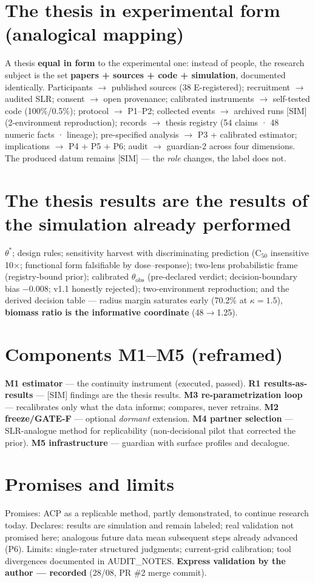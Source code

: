 \documentclass[10pt,twocolumn]{article}
\begin{document}
\section{The thesis in experimental form (analogical mapping)}
A thesis \textbf{equal in form} to the experimental one: instead of people, the research subject is the set \textbf{papers + sources + code + simulation}, documented identically. Participants $\to$ published sources (38 E-registered); recruitment $\to$ audited SLR; consent $\to$ open provenance; calibrated instruments $\to$ self-tested code (100\%/0.5\%); protocol $\to$ P1--P2; collected events $\to$ archived runs [SIM] (2-environment reproduction); records $\to$ thesis registry (54 claims · 48 numeric facts · lineage); pre-specified analysis $\to$ P3 + calibrated estimator; implications $\to$ P4 + P5 + P6; audit $\to$ guardian-2 across four dimensions. The produced datum remains [SIM] — the \emph{role} changes, the label does not.
\section{The thesis results are the results of the simulation already performed}
$\theta^{*}$; design rules; sensitivity harvest with discriminating prediction (C$_{50}$ insensitive 10$\times$; functional form falsifiable by dose--response); two-lens probabilistic frame (registry-bound prior); calibrated $\theta_{\text{obs}}$ (pre-declared verdict; decision-boundary bias $-0.008$; v1.1 honestly rejected); two-environment reproduction; and the derived decision table — radius margin saturates early (70.2\% at $\kappa{=}1.5$), \textbf{biomass ratio is the informative coordinate} (48$\to$1.25).
\section{Components M1--M5 (reframed)}
\textbf{M1 estimator} — the continuity instrument (executed, passed). \textbf{R1 results-as-results} — [SIM] findings are the thesis results. \textbf{M3 re-parametrization loop} — recalibrates only what the data informs; compares, never retrains. \textbf{M2 freeze/GATE-F} — optional \emph{dormant} extension. \textbf{M4 partner selection} — SLR-analogue method for replicability (non-decisional pilot that corrected the prior). \textbf{M5 infrastructure} — guardian with surface profiles and decalogue.
\section{Promises and limits}
Promises: ACP as a replicable method, partly demonstrated, to continue research today. Declares: results are simulation and remain labeled; real validation not promised here; analogous future data mean subsequent steps already advanced (P6). Limits: single-rater structured judgments; current-grid calibration; tool divergences documented in AUDIT\_NOTES. \textbf{Express validation by the author — recorded} (28/08, PR \#2 merge commit).
\end{document}
